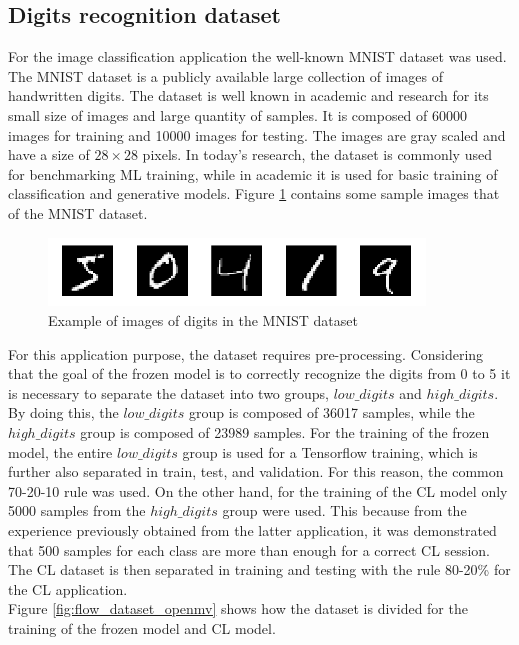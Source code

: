 \documentclass[12pt]{report}
\begin{document}
\subsection{Digits recognition dataset}
For the image classification application the well-known MNIST dataset was used. The MNIST dataset is a publicly available large collection of images of handwritten digits. The dataset is well known in academic and research for its small size of images and large quantity of samples. It is composed of 60000 images for training and 10000 images for testing. The images are gray scaled and have a size of $28 \times 28$ pixels. In today's research, the dataset is commonly used for benchmarking ML training, while in academic it is used for basic training of classification and generative models. Figure \ref{fig:mnist_dataset} contains some sample images that of the MNIST dataset.\\

\begin{figure}[h!]
    \centering
    \includegraphics[width=100mm]{Figures/Chapter4/mnist_dataset.png} 
    \caption{Example of images of digits in the MNIST dataset}
    \label{fig:mnist_dataset}    
\end{figure}

For this application purpose, the dataset requires pre-processing. Considering that the goal of the frozen model is to correctly recognize the digits from 0 to 5 it is necessary to separate the dataset into two groups, $low\_digits$ and $high\_digits$. By doing this, the $low\_digits$ group is composed of 36017 samples, while the $high\_digits$ group is composed of 23989 samples. For the training of the frozen model, the entire $low\_digits$ group is used for a Tensorflow training, which is further also separated in train, test, and validation. For this reason, the common 70-20-10 rule was used. On the other hand, for the training of the CL model only 5000 samples from the $high\_digits$ group were used. This because from the experience previously obtained from the latter application, it was demonstrated that 500 samples for each class are more than enough for a correct CL session. The CL dataset is then separated in training and testing with the rule 80-20\% for the CL application. \\
Figure \ref{fig:flow_dataset_openmv} shows how the dataset is divided for the training of the frozen model and CL model.
\end{document}
